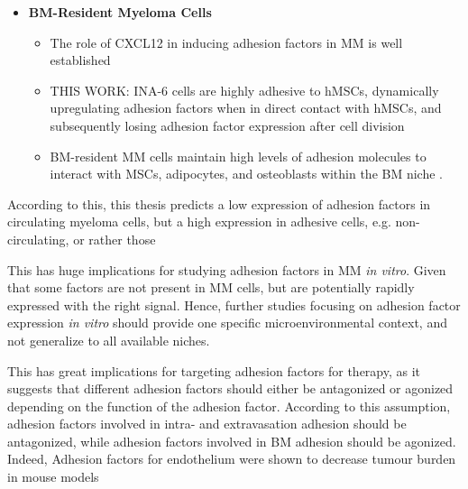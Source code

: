 \begin{itemize}
      \item \textbf{BM-Resident Myeloma Cells}
            \begin{itemize}
                  \item The role of CXCL12  in inducing adhesion factors in MM is well established
                        \cite{ullahRoleCXCR4Multiple2019}
                  \item THIS WORK: INA-6 cells are highly adhesive to hMSCs, dynamically
                        upregulating adhesion factors when in direct contact with
                        hMSCs, and subsequently losing adhesion factor expression after
                        cell division
                  \item BM-resident MM cells maintain high levels of adhesion
                        molecules to interact with MSCs, adipocytes, and
                        osteoblasts within the BM niche
                        \cite{bouzerdanAdhesionMoleculesMultiple2022,
                              burgerGp130RasMediated2001,
                              chatterjeePresenceBoneMarrow2002}.
            \end{itemize}

\end{itemize}


According to this, this thesis
predicts a low expression of adhesion factors in circulating myeloma cells,
but a high expression in adhesive cells, e.g. non-circulating, or rather those


This has huge implications for studying adhesion factors in MM \textit{in
      vitro}. Given that some factors are not present in MM cells, but are potentially
rapidly expressed with the right signal. Hence, further studies focusing on
adhesion factor expression \textit{in vitro} should provide one specific
microenvironmental context, and not generalize to all available niches.


This has great implications for targeting adhesion factors for therapy, as it
suggests that different adhesion factors should either be antagonized or
agonized depending on the function of the adhesion factor. According to this
assumption, adhesion factors involved in intra- and extravasation adhesion
should be antagonized, while adhesion factors involved in BM adhesion
 should be agonized. Indeed, Adhesion
factors for endothelium were shown to decrease tumour burden in mouse models
\cite{asosinghUniquePathwayHoming2001a,mrozikTherapeuticTargetingNcadherin2015}

